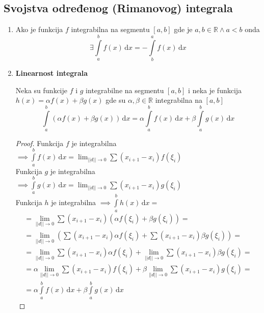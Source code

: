 \subsection{Svojstva određenog (Rimanovog) integrala}
\begin{enumerate}[label=\textbf{\arabic*.)}]
	\item
		\begin{theorem}
			Ako je funkcija $f$ integrabilna na segmentu $[a,b]$ gde je $a,b \in \mathbb{R} \land a<b$ onda $$\exists \int \limits^b_a f(x) \, \mathrm{d}x = - \int \limits^a_b f(x) \, \mathrm{d}x$$
		\end{theorem}
	\item 
		\textbf{Linearnost integrala}
		
		\begin{theorem}
				Neka su funkcije $f$ i $g$ integrabilne na segmentu $[a,b]$ i neka je funkcija $h(x) = \alpha f(x)+ \beta g(x)$ gde su $\alpha, \beta \in \mathbb{R}$ integrabilna na $[a,b]$
				$$\int\limits^b_a \left(\alpha f(x) + \beta g(x)\right) \, \mathrm{d} x = \alpha \int \limits^b_a f(x)\, \mathrm{d} x + \beta \int \limits^b_a g(x) \, \mathrm{d} x$$
		\end{theorem}
		\begin{proof}
			Funkcija $f$ je integrabilna $\implies \int \limits^b_a f(x) \, \mathrm{d}x = \lim_{||d|| \to 0} \sum (x_{i+1}-x_i)f(\xi_i)$\\
			Funkcija $g$ je integrabilna $\implies \int \limits^b_a g(x) \, \mathrm{d}x = \lim_{||d|| \to 0} \sum (x_{i+1}-x_i)g(\xi_i)$\\
			Funkcija $h$ je integrabilna $\implies \int \limits^b_a h(x) \, \mathrm{d}x =$\\
			\begin{gather*}
				=\lim_{||d|| \to 0} \sum (x_{i+1}-x_i)(\alpha f(\xi_i) + \beta g(\xi_i)) =\\
				= \lim_{||d|| \to 0} \left(\sum (x_{i+1}-x_i)\alpha f(\xi_i) + \sum (x_{i+1}-x_i)\beta g(\xi_i)\right) =\\
				= \lim_{||d|| \to 0} \sum (x_{i+1}-x_i)\alpha f(\xi_i) + \lim_{||d|| \to 0}\sum (x_{i+1}-x_i)\beta g(\xi_i) =\\
				= \alpha\lim_{||d|| \to 0} \sum (x_{i+1}-x_i) f(\xi_i) + \beta \lim_{||d|| \to 0}\sum (x_{i+1}-x_i) g(\xi_i) =\\
				= \alpha \int \limits^b_a f(x) \, \mathrm{d}x + \beta \int 	\limits^b_a g(x) \, \mathrm{d}x
			\end{gather*}
		\end{proof}

\end{enumerate}
